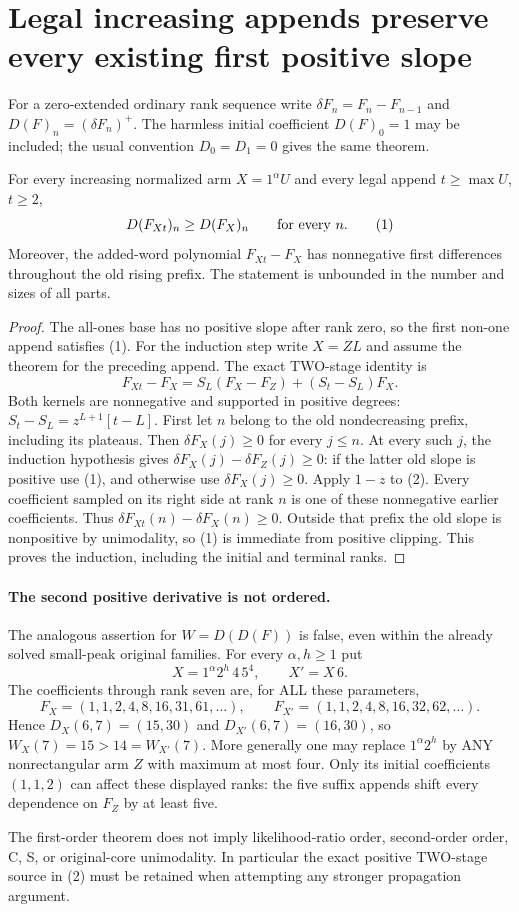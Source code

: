 \section{Legal increasing appends preserve every existing first positive slope}
For a zero-extended ordinary rank sequence write
$\delta F_n=F_n-F_{n-1}$ and $D(F)_n=(\delta F_n)^+$.
The harmless initial coefficient $D(F)_0=1$ may be included;
the usual convention $D_0=D_1=0$ gives the same theorem.

\begin{theorem}
For every increasing normalized arm $X=1^\alpha U$ and every
legal append $t\ge\max U$, $t\ge2$,
\[
                         D(F_{Xt})_n\ge D(F_X)_n
                         \qquad\hbox{for every }n.       \tag{1}
\]
Moreover, the added-word polynomial $F_{Xt}-F_X$ has
nonnegative first differences throughout the old rising prefix.
The statement is unbounded in the number and sizes of all parts.
\end{theorem}
\begin{proof}
The all-ones base has no positive slope after rank zero, so the
first non-one append satisfies (1). For the induction step write
$X=ZL$ and assume the theorem for the preceding append.
The exact TWO-stage identity is
\[
 F_{Xt}-F_X=S_L(F_X-F_Z)+(S_t-S_L)F_X.                  \tag{2}
\]
Both kernels are nonnegative and supported in positive degrees:
$S_t-S_L=z^{L+1}[t-L]$. First let $n$ belong to the old
nondecreasing prefix, including its plateaus. Then
$\delta F_X(j)\ge0$ for every
$j\le n$. At every such $j$, the induction hypothesis gives
$\delta F_X(j)-\delta F_Z(j)\ge0$: if the latter old slope
is positive use (1), and otherwise use $\delta F_X(j)\ge0$.
Apply $1-z$ to (2). Every coefficient sampled on its right side
at rank $n$ is one of these nonnegative earlier coefficients.
Thus $\delta F_{Xt}(n)-\delta F_X(n)\ge0$. Outside that
prefix the old slope is nonpositive by unimodality, so (1)
is immediate from positive clipping. This
proves the induction, including the initial and terminal ranks.
\end{proof}

\paragraph{The second positive derivative is not ordered.}
The analogous assertion for $W=D(D(F))$ is false, even within
the already solved small-peak original families. For every
$\alpha,h\ge1$ put
\[
 X=1^\alpha 2^h\,4\,5^4,\qquad X'=X\,6.
\]
The coefficients through rank seven are, for ALL these parameters,
\[
 F_X=(1,1,2,4,8,16,31,61,\ldots),\qquad
 F_{X'}=(1,1,2,4,8,16,32,62,\ldots).
\]
Hence $D_X(6,7)=(15,30)$ and $D_{X'}(6,7)=(16,30)$,
so $W_X(7)=15>14=W_{X'}(7)$.
More generally one may replace $1^\alpha2^h$ by ANY nonrectangular
arm $Z$ with maximum at most four. Only its initial coefficients
$(1,1,2)$ can affect these displayed ranks: the five suffix
appends shift every dependence on $F_Z$ by at least five.

The first-order theorem does not imply likelihood-ratio order,
second-order order, C, S, or original-core unimodality. In particular
the exact positive TWO-stage source in (2) must be retained when
attempting any stronger propagation argument.
